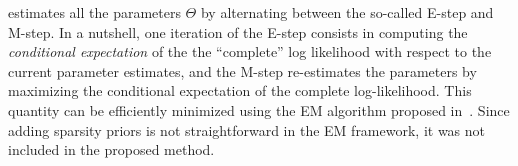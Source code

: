  estimates all the parameters $\Theta$ by alternating between the so-called E-step and M-step.
In a nutshell, one iteration of the E-step consists in computing the \textit{conditional expectation} of the the ``complete'' log likelihood with respect to the current parameter estimates,
and the M-step re-estimates the parameters by maximizing the conditional expectation of the complete log-likelihood.
This quantity can be efficiently minimized using the \ac{EM} algorithm proposed in~.
Since adding sparsity priors is not straightforward in the \ac{EM} framework, it was not included in the proposed method.


